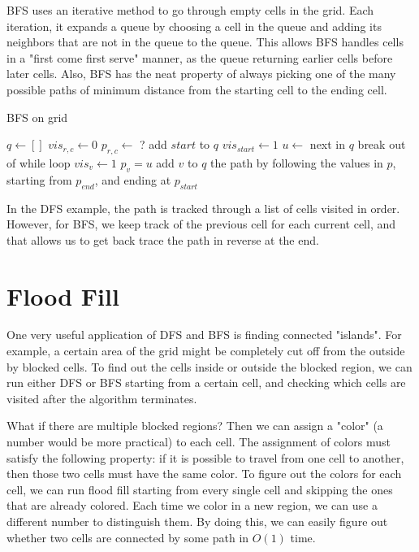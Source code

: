 \documentclass{article}
\begin{document}
    BFS uses an iterative method to go through empty cells in the grid. Each iteration, it expands a queue by choosing a cell in the queue and adding its neighbors that are not in the queue to the queue. This allows BFS handles cells in a "first come first serve" manner, as the queue returning earlier cells before later cells. Also, BFS has the neat property of always picking one of the many possible paths of minimum distance from the starting cell to the ending cell.

    \begin{algorithm}[H]
        \caption{BFS on grid}
        \begin{algorithmic}[1]
                \State $q \gets []$
                \State $vis_{r, c} \gets 0$
                \State $p_{r, c} \gets $ ?
                \State add $start$ to $q$
                \State $vis_{start} \gets 1$
                    \State $u \gets$ next in $q$
                        \State break out of while loop
                    \EndIf
                            \State $vis_v \gets 1$
                            \State $p_v = u$
                            \State add $v$ to $q$
                        \EndIf
                    \EndFor
                \EndWhile
                \State \Return the path by following the values in $p$, starting from $p_{end}$, and ending at $p_{start}$
            \EndFunction
        \end{algorithmic}
    \end{algorithm}

    In the DFS example, the path is tracked through a list of cells visited in order. However, for BFS, we keep track of the previous cell for each current cell, and that allows us to get back trace the path in reverse at the end.

    \section{Flood Fill}
    One very useful application of DFS and BFS is finding connected "islands". For example, a certain area of the grid might be completely cut off from the outside by blocked cells. To find out the cells inside or outside the blocked region, we can run either DFS or BFS starting from a certain cell, and checking which cells are visited after the algorithm terminates.

    What if there are multiple blocked regions? Then we can assign a "color" (a number would be more practical) to each cell. The assignment of colors must satisfy the following property: if it is possible to travel from one cell to another, then those two cells must have the same color. To figure out the colors for each cell, we can run flood fill starting from every single cell and skipping the ones that are already colored. Each time we color in a new region, we can use a different number to distinguish them. By doing this, we can easily figure out whether two cells are connected by some path in $O(1)$ time.
\end{document}
